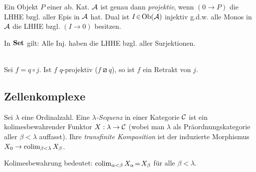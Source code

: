 \documentclass{cheat-sheet}
\newcommand{\lhhe}{\boxslash} %
\begin{document}
\begin{samepage}
\begin{bsp}
  Ein Objekt $P$ einer ab. Kat. $\mathcal{A}$ ist genau dann \emph{projektiv}, wenn $(0 \to P)$ die LHHE bzgl. aller Epis in $\mathcal{A}$ hat.
  Dual ist $I \!\in\! \operatorname{Ob}(\mathcal{A})$ injektiv g.d.w. alle Monos in $\mathcal{A}$ die LHHE bzgl. $(I \to 0)$ besitzen.
\end{bsp}

\begin{bsp}
  In $\mathbf{Set}$ gilt: Alle Inj. haben die LHHE bzgl. aller Surjektionen.
\end{bsp}

\begin{lem}\mbox{}\\
  Sei $f \!=\! q \circ j$. Ist $f$ $q$-projektiv ($f \lhhe q$), so ist $f$ ein Retrakt von $j$.
\end{lem}

\subsection{Zellenkomplexe}

\end{samepage}

\begin{defn}
  Sei $\lambda$ eine Ordinalzahl. Eine \emph{$\lambda$-Sequenz} in einer Kategorie $\mathcal{C}$ ist ein kolimesbewahrender Funktor $X : \lambda \to \mathcal{C}$ (wobei man $\lambda$ als Präordnungskategorie aller $\beta < \lambda$ auffasst).
  Ihre \emph{transfinite Komposition} ist der induzierte Morphismus $X_0 \to \operatorname{colim}_{\beta < \lambda} X_\beta$.
\end{defn}

\begin{bem}
  Kolimesbewahrung bedeutet: $\operatorname{colim}_{\alpha < \beta} X_\alpha \!=\! X_\beta$ für alle $\beta \!<\! \lambda$.
\end{bem}


\end{document}
